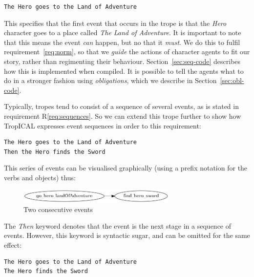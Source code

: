 \documentclass[11pt]{report}
\begin{document}
\begin{lstlisting}[label={lst:seq1}, caption={An event}]
The Hero goes to the Land of Adventure
\end{lstlisting}

This specifies that the first event that occurs in the trope is that the \emph{Hero}
character goes to a place called \emph{The Land of Adventure}. It is important
to note that this means the event \emph{can} happen, but no that it \emph{must}.
We do this to fulfil requirement~\ref{req:norm}, so that we \emph{guide}
the actions of character agents to fit our story, rather than regimenting their
behaviour. Section~\ref{sec:seq-code} describes how this is implemented when compiled. It is
possible to tell the agents what to do in a stronger fashion using
\emph{obligations}, which we describe in Section~\ref{sec:obl-code}.

Typically, tropes tend to consist
of a sequence of several events, as is stated in requirement R\ref{req:sequences}. So we can
extend this trope further to show how TropICAL expresses event sequences in
order to this requirement:

\begin{lstlisting}[label={lst:seq2}, caption={Two consecutive events}]
The Hero goes to the Land of Adventure
Then the Hero finds the Sword
\end{lstlisting}

This series of events can be visualised graphically (using a prefix notation for
the verbs and objects) thus:

\begin{figure}[h]
\caption{Two consecutive events}
\label{fig:seq1}
\vspace{7mm}
\centerline{\includegraphics[width=0.7\textwidth]{seq1.png}}
\vspace{7mm}
\end{figure}

The \emph{Then} keyword denotes that the event is the next stage in a sequence
of events. However, this keyword is syntactic sugar, and can be omitted for the same effect:

\begin{lstlisting}[label={lst:seq3}, caption={``The'' instead of ``Then''}]
The Hero goes to the Land of Adventure
The Hero finds the Sword
\end{lstlisting}
\end{document}

